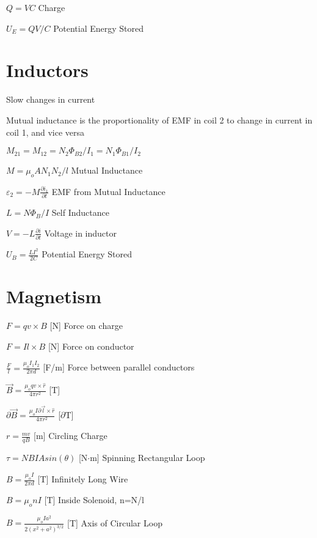 \documentclass{article}
\begin{document}
\LARGE$Q =VC$
\large{Charge}

\LARGE$U_E = QV/C$
\large{Potential Energy Stored}


\section{Inductors }

\large Slow changes in current

\large{Mutual inductance is the proportionality of EMF in coil 2 to change in current in coil 1, and vice versa}

\LARGE$M_{21} =M_{12}=N_2\Phi_{B2}/I_1=N_1\Phi_{B1}/I_2$

\LARGE$M =\mu_oAN_1N_2/l$
\large{Mutual Inductance}


\LARGE$\varepsilon_2 =-M\frac{\partial{i_1}}{\partial{t}}$
\large{EMF from Mutual Inductance}

\LARGE$L =N\Phi_B/I$
\large{Self Inductance}

\LARGE$V =-L \frac{\partial{i}}{\partial{t}}$
\large{Voltage in inductor}

\LARGE$U_B = \frac{LI^2}{2C}$
\large{Potential Energy Stored}


\section{Magnetism}


\LARGE{$F=qv\times{B}$ }
\large{[N]}
\large{Force on charge}

\LARGE{$F=Il\times{B}$ }
\large{[N]}
\large{Force on conductor}

\LARGE{$\frac{F}{l}=\frac{\mu_oI_1I_2}{2\pi{d}}$ }
\large{[F/m]}
\large{Force between parallel conductors}


\LARGE{$\vec{B}=
    \frac{\mu_o qv \times \hat{r}}
    {4\pi r^2}$ }
\large{[T]}

\LARGE{$\partial\vec{B}=
    \frac{\mu_o I \partial\vec{l} \times \hat{r}}
    {4\pi r^2}$ }
\large{[$\partial$T]}

\LARGE{$r=\frac{mv}{qB}$}
\large{[m]}
\large Circling Charge


\LARGE{$\tau=NBIAsin(\theta)$ }
\large{[N$\cdot$m]}
\large{Spinning Rectangular Loop}

\LARGE{$B=
    \frac{\mu_o I}
    {2\pi d}$ }
\large{[T]}
\large Infinitely Long Wire

\LARGE{$B=
    \mu_{o}nI$ }
\large{[T]}
\large Inside Solenoid, n=N/l

\LARGE{$B=
    \frac{\mu_{o}Ia^2}
    {2(x^2+a^2)^{3/2}}$ }
\large{[T]}
\large Axis of Circular Loop
\end{document}

